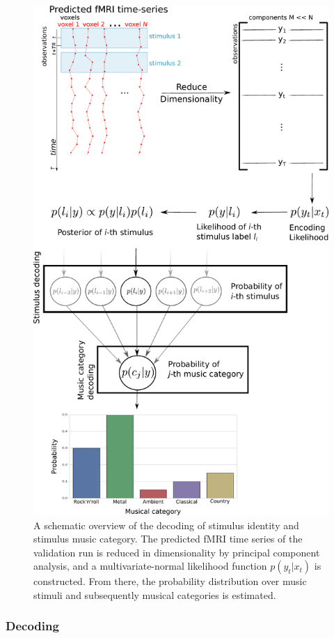 \begin{figure}
  \centering
  \includegraphics[width=.8\linewidth]{pics/decoding_scheme.pdf}

  \caption{A schematic overview of the decoding of stimulus identity and stimulus music category. The
    predicted f{MRI} time series of the validation run is reduced in
    dimensionality by principal component analysis, and a multivariate-normal
    likelihood function $p(y_{t}|x_{t})$ is constructed.  From there, the
  probability distribution over music stimuli and subsequently musical
categories is estimated.}

 \label{fig:decoding_scheme}
\end{figure}


\subsubsection*{Decoding}


